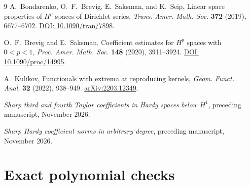 \documentclass[11pt]{article}
\begin{document}
\small
\begin{thebibliography}{9}
\setlength{\itemsep}{2pt}
A.~Bondarenko, O.~F.~Brevig, E.~Saksman, and K.~Seip,
Linear space properties of \(H^p\) spaces of Dirichlet series,
\emph{Trans. Amer. Math. Soc.} \textbf{372} (2019), 6677--6702.
\href{https://doi.org/10.1090/tran/7898}{DOI: 10.1090/tran/7898}.

O.~F.~Brevig and E.~Saksman, Coefficient estimates for \(H^p\)
spaces with \(0<p<1\), \emph{Proc. Amer. Math. Soc.} \textbf{148}
(2020), 3911--3924.
\href{https://doi.org/10.1090/proc/14995}{DOI: 10.1090/proc/14995}.

A.~Kulikov, Functionals with extrema at reproducing kernels,
\emph{Geom. Funct. Anal.} \textbf{32} (2022), 938--949.
\href{https://arxiv.org/abs/2203.12349}{arXiv:2203.12349}.

\emph{Sharp third and fourth Taylor coefficients in Hardy
spaces below \(H^1\)}, preceding manuscript, November 2026.

\emph{Sharp Hardy coefficient norms in arbitrary degree},
preceding manuscript, November 2026.
\end{thebibliography}

\appendix
\section{Exact polynomial checks}
\end{document}

